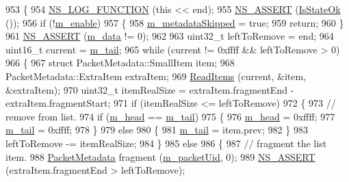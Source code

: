 \begin{DoxyCode}
953 \{
954   \hyperlink{log-macros-disabled_8h_a90b90d5bad1f39cb1b64923ea94c0761}{NS\_LOG\_FUNCTION} (\textcolor{keyword}{this} << end);
955   \hyperlink{assert_8h_a6dccdb0de9b252f60088ce281c49d052}{NS\_ASSERT} (\hyperlink{classns3_1_1PacketMetadata_a208d3163e28704438cdd4d30318e489c}{IsStateOk} ());
956   \textcolor{keywordflow}{if} (!\hyperlink{classns3_1_1PacketMetadata_a666ea556ffbd8f2226195cde1abe7ae7}{m\_enable}) 
957     \{
958       \hyperlink{classns3_1_1PacketMetadata_ac370960e8881e5a7280122e9dc5f7ace}{m\_metadataSkipped} = \textcolor{keyword}{true};
959       \textcolor{keywordflow}{return};
960     \}
961   \hyperlink{assert_8h_a6dccdb0de9b252f60088ce281c49d052}{NS\_ASSERT} (\hyperlink{classns3_1_1PacketMetadata_a6a7206086aec2a73a094fe072650b9ee}{m\_data} != 0);
962 
963   uint32\_t leftToRemove = end;
964   uint16\_t current = \hyperlink{classns3_1_1PacketMetadata_ad24a659e236af7b98c475c97c4f60db9}{m\_tail};
965   \textcolor{keywordflow}{while} (current != 0xffff && leftToRemove > 0)
966     \{
967       \textcolor{keyword}{struct }PacketMetadata::SmallItem item;
968       PacketMetadata::ExtraItem extraItem;
969       \hyperlink{classns3_1_1PacketMetadata_a3719ad2c32313a9a1c74462322e8b517}{ReadItems} (current, &item, &extraItem);
970       uint32\_t itemRealSize = extraItem.fragmentEnd - extraItem.fragmentStart;
971       \textcolor{keywordflow}{if} (itemRealSize <= leftToRemove)
972         \{
973           \textcolor{comment}{// remove from list.}
974           \textcolor{keywordflow}{if} (\hyperlink{classns3_1_1PacketMetadata_a46b3ef0a9a80a798ad1e81b5694a5658}{m\_head} == \hyperlink{classns3_1_1PacketMetadata_ad24a659e236af7b98c475c97c4f60db9}{m\_tail})
975             \{
976               \hyperlink{classns3_1_1PacketMetadata_a46b3ef0a9a80a798ad1e81b5694a5658}{m\_head} = 0xffff;
977               \hyperlink{classns3_1_1PacketMetadata_ad24a659e236af7b98c475c97c4f60db9}{m\_tail} = 0xffff;
978             \}
979           \textcolor{keywordflow}{else}
980             \{
981               \hyperlink{classns3_1_1PacketMetadata_ad24a659e236af7b98c475c97c4f60db9}{m\_tail} = item.prev;
982             \}
983           leftToRemove -= itemRealSize;
984         \}
985       \textcolor{keywordflow}{else}
986         \{
987           \textcolor{comment}{// fragment the list item.}
988           \hyperlink{classns3_1_1PacketMetadata_a78447d800a9c3b6c85a3f38a09682b00}{PacketMetadata} fragment (\hyperlink{classns3_1_1PacketMetadata_ad97fbc08482c155bc4c11fdff820be86}{m\_packetUid}, 0);
989           \hyperlink{assert_8h_a6dccdb0de9b252f60088ce281c49d052}{NS\_ASSERT} (extraItem.fragmentEnd > leftToRemove);

\end{DoxyCode}
